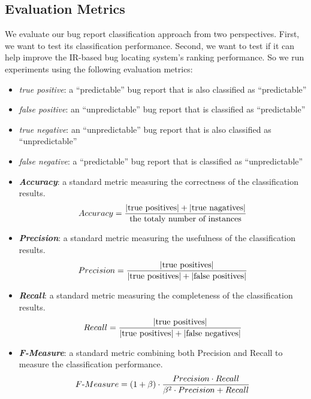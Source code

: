 \subsection{Evaluation Metrics}
\label{sec:evaluation metrics}
We evaluate our bug report classification approach from two perspectives. First, we want to test its classification performance. Second, we want to test if it can help improve the IR-based bug locating system's ranking performance. So we run experiments using the following evaluation metrics:
\begin{itemize}
	\item \textit{true positive}: a ``predictable'' bug report that is also classified as ``predictable''
	\item \textit{false positive}: an ``unpredictable'' bug report that is classified as ``predictable''
	\item \textit{true negative}: an ``unpredictable'' bug report that is also classified as ``unpredictable''
	\item \textit{false negative}: a ``predictable'' bug report that is classified as ``unpredictable''
	\item \textit{\textbf{Accuracy}}: a standard metric measuring the correctness of the classification results.
  	\begin{equation}
		Accuracy = {|\text{true positives}| + |\text{true nagatives}| \over {\text{the totaly number of instances}}} 
	\end{equation}
   	\item \textit{\textbf{Precision}}: a standard metric measuring the usefulness of the classification results.
  	\begin{equation}
		Precision = {|\text{true positives}| \over {|\text{true positives}| + |\text{false positives}|}} 
	\end{equation}
   	\item \textit{\textbf{Recall}}: a standard metric measuring the completeness of the classification results.
  	\begin{equation}
		Recall = {|\text{true positives}| \over {|\text{true positives}| + |\text{false negatives}|}} 
	\end{equation}
	\item \textit{\textbf{F-Measure}}: a standard metric combining both Precision and Recall to measure the classification performance.
  	\begin{equation}
		F\text{-}Measure = (1 + \beta) \cdot {{Precision \cdot Recall} \over {\beta^2 \cdot Precision + Recall}} 

\end{equation}
\end{itemize}
